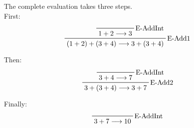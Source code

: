 \begin{frame}
  The complete evaluation takes three steps. \\

  First:
  \begin{displaymath}
    \prftree[r]{E-Add1}
    {\prftree[r]{E-AddInt}
      {}
      {1 + 2 \longrightarrow 3}
    }
    {(1 + 2) + (3 + 4) \longrightarrow 3 + (3 + 4)}
  \end{displaymath}

  Then:
  \begin{displaymath}
    \prftree[r]{E-Add2}
    {\prftree[r]{E-AddInt}
      {}
      {3 + 4 \longrightarrow 7}
    }
    {3 + (3 + 4) \longrightarrow 3 + 7}
  \end{displaymath}

  Finally:
  \begin{displaymath}
    \prftree[r]{E-AddInt}
    {}
    {3 + 7 \longrightarrow 10}
  \end{displaymath}
\end{frame}
